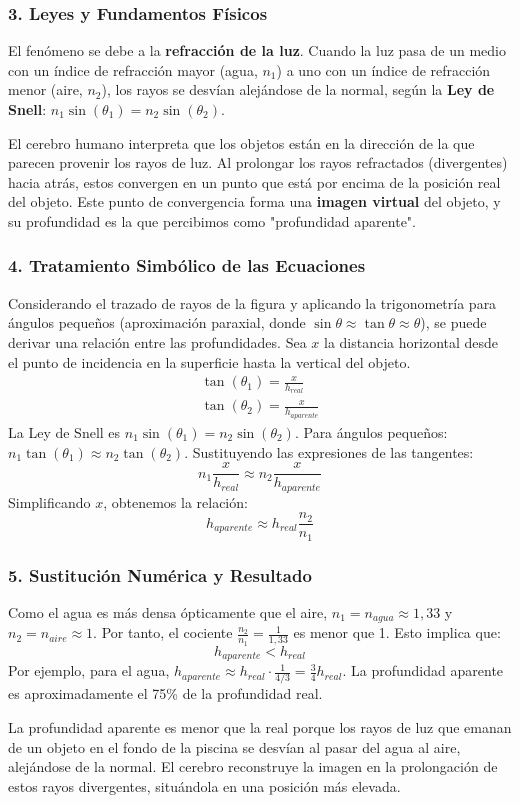 \subsubsection*{3. Leyes y Fundamentos Físicos}
El fenómeno se debe a la \textbf{refracción de la luz}. Cuando la luz pasa de un medio con un índice de refracción mayor (agua, $n_1$) a uno con un índice de refracción menor (aire, $n_2$), los rayos se desvían alejándose de la normal, según la \textbf{Ley de Snell}: $n_1 \sin(\theta_1) = n_2 \sin(\theta_2)$.

El cerebro humano interpreta que los objetos están en la dirección de la que parecen provenir los rayos de luz. Al prolongar los rayos refractados (divergentes) hacia atrás, estos convergen en un punto que está por encima de la posición real del objeto. Este punto de convergencia forma una \textbf{imagen virtual} del objeto, y su profundidad es la que percibimos como "profundidad aparente".

\subsubsection*{4. Tratamiento Simbólico de las Ecuaciones}
Considerando el trazado de rayos de la figura y aplicando la trigonometría para ángulos pequeños (aproximación paraxial, donde $\sin \theta \approx \tan \theta \approx \theta$), se puede derivar una relación entre las profundidades.
Sea $x$ la distancia horizontal desde el punto de incidencia en la superficie hasta la vertical del objeto.
\begin{gather}
    \tan(\theta_1) = \frac{x}{h_{real}} \\
    \tan(\theta_2) = \frac{x}{h_{aparente}}
\end{gather}
La Ley de Snell es $n_1 \sin(\theta_1) = n_2 \sin(\theta_2)$. Para ángulos pequeños: $n_1 \tan(\theta_1) \approx n_2 \tan(\theta_2)$.
Sustituyendo las expresiones de las tangentes:
$$n_1 \frac{x}{h_{real}} \approx n_2 \frac{x}{h_{aparente}}$$
Simplificando $x$, obtenemos la relación:
$$h_{aparente} \approx h_{real} \frac{n_2}{n_1}$$

\subsubsection*{5. Sustitución Numérica y Resultado}
Como el agua es más densa ópticamente que el aire, $n_1 = n_{agua} \approx 1,33$ y $n_2 = n_{aire} \approx 1$. Por tanto, el cociente $\frac{n_2}{n_1} = \frac{1}{1,33}$ es menor que 1.
Esto implica que:
$$h_{aparente} < h_{real}$$
Por ejemplo, para el agua, $h_{aparente} \approx h_{real} \cdot \frac{1}{4/3} = \frac{3}{4} h_{real}$. La profundidad aparente es aproximadamente el 75\% de la profundidad real.
\begin{cajaresultado}
La profundidad aparente es menor que la real porque los rayos de luz que emanan de un objeto en el fondo de la piscina se desvían al pasar del agua al aire, alejándose de la normal. El cerebro reconstruye la imagen en la prolongación de estos rayos divergentes, situándola en una posición más elevada.
\end{cajaresultado}


